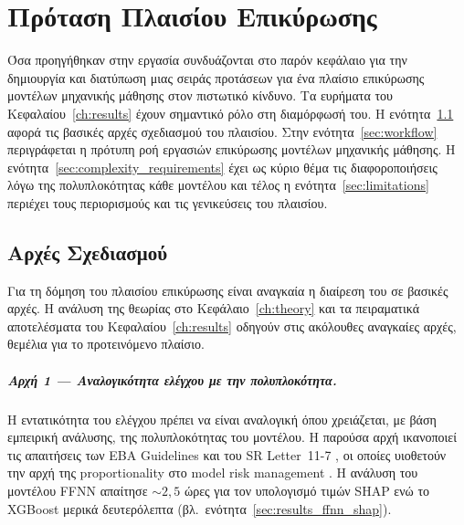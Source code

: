 \chapter{Πρόταση Πλαισίου Επικύρωσης}
\label{ch:framework}

Όσα προηγήθηκαν στην εργασία συνδυάζονται στο παρόν κεφάλαιο για
την δημιουργία και διατύπωση μιας σειράς προτάσεων για ένα πλαίσιο
επικύρωσης μοντέλων μηχανικής μάθησης στον πιστωτικό κίνδυνο.
Τα ευρήματα του Κεφαλαίου~\ref{ch:results} έχουν σημαντικό ρόλο
στη διαμόρφωσή του. Η ενότητα~\ref{sec:principles} αφορά τις
βασικές αρχές σχεδιασμού του πλαισίου. Στην
ενότητα~\ref{sec:workflow} περιγράφεται η πρότυπη ροή εργασιών
επικύρωσης μοντέλων μηχανικής μάθησης. Η
ενότητα~\ref{sec:complexity_requirements} έχει ως κύριο θέμα τις
διαφοροποιήσεις λόγω της πολυπλοκότητας κάθε μοντέλου και τέλος
η ενότητα~\ref{sec:limitations} περιέχει τους περιορισμούς και
τις γενικεύσεις του πλαισίου.

\section{Αρχές Σχεδιασμού}
\label{sec:principles}

Για τη δόμηση του πλαισίου επικύρωσης είναι αναγκαία η διαίρεση
του σε βασικές αρχές. Η ανάλυση της θεωρίας στο
Κεφάλαιο~\ref{ch:theory} και τα πειραματικά αποτελέσματα του
Κεφαλαίου~\ref{ch:results} οδηγούν στις ακόλουθες αναγκαίες
αρχές, θεμέλια για το προτεινόμενο πλαίσιο.

\paragraph{Αρχή 1 --- Αναλογικότητα ελέγχου με την πολυπλοκότητα.}
Η εντατικότητα του ελέγχου πρέπει να είναι αναλογική όπου χρειάζεται,
 με βάση εμπειρική ανάλυσης, της
πολυπλοκότητας του μοντέλου. Η παρούσα αρχή ικανοποιεί τις απαιτήσεις των EBA Guidelines και του 
SR Letter~11-7 \citep{eba2023, sr117}, οι οποίες υιοθετούν την αρχή της 
proportionality στο model risk management \citep{bis2024principles}. Η ανάλυση
του μοντέλου FFNN απαίτησε ${\sim}2{,}5$ ώρες για τον υπολογισμό
τιμών SHAP ενώ το XGBoost μερικά δευτερόλεπτα
(βλ.\ ενότητα~\ref{sec:results_ffnn_shap}).

